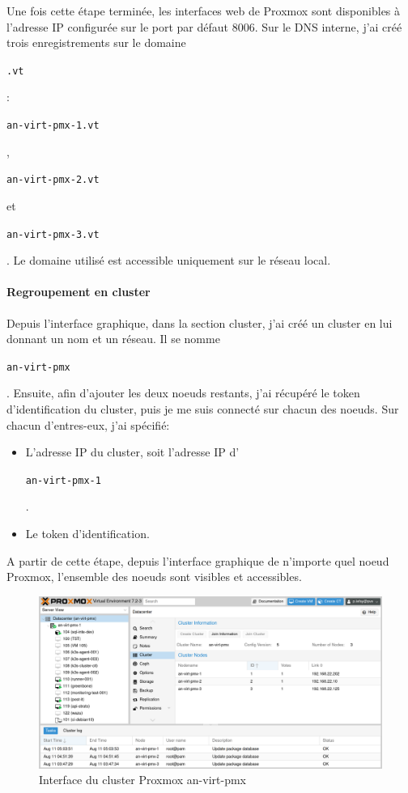 \documentclass[12pt]{article}
\begin{document}
Une fois cette étape terminée, les interfaces web de \gls{Proxmox} sont disponibles à l'adresse \gls{IP} configurée sur le port par défaut 8006.
Sur le \gls{DNS} interne, j'ai créé trois enregistrements sur le domaine \begin{code}\texttt{.vt}\end{code}: \begin{code}\texttt{an-virt-pmx-1.vt}\end{code}, \begin{code}\texttt{an-virt-pmx-2.vt}\end{code} et \begin{code}\texttt{an-virt-pmx-3.vt}\end{code}.
Le domaine utilisé est accessible uniquement sur le réseau local.

\paragraph{Regroupement en \gls{cluster}}
Depuis l'interface graphique, dans la section \gls{cluster}, j'ai créé un \gls{cluster} en lui donnant un nom et un réseau. 
Il se nomme \begin{code}\texttt{an-virt-pmx}\end{code}.
Ensuite, afin d'ajouter les deux noeuds restants, j'ai récupéré le token d'identification du \gls{cluster}, puis je me suis connecté sur chacun des noeuds. 
Sur chacun d'entres-eux, j'ai spécifié:
\begin{itemize}
    \item L'adresse \gls{IP} du \gls{cluster}, soit l'adresse \gls{IP} d'\begin{code}\texttt{an-virt-pmx-1}\end{code}.
    \item Le token d'identification.
\end{itemize}

A partir de cette étape, depuis l'interface graphique de n'importe quel noeud \gls{Proxmox}, l'ensemble des noeuds sont visibles et accessibles.

\begin{figure}[ht!]
    \centering
        \includegraphics[width=\textwidth]{src/proxmox_interface.png}
    \caption{Interface du \gls{cluster} \gls{Proxmox} an-virt-pmx}
    \label{fig:proxmox_virt1}
\end{figure}
\end{document}
